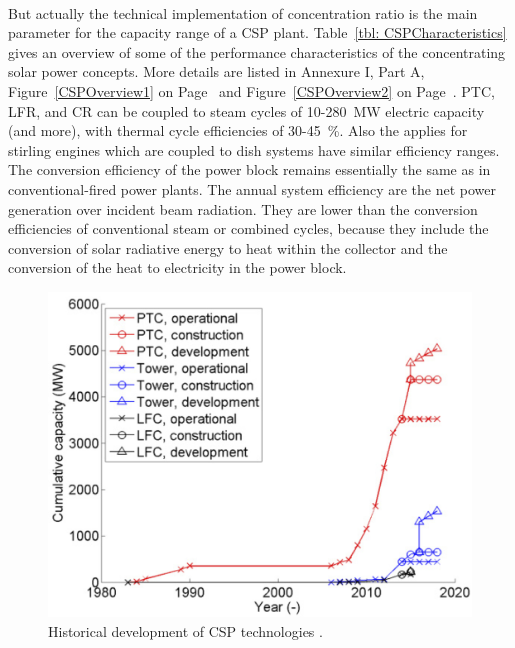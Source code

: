 \documentclass[Master,MEE,english]{twbook}%
\begin{document}
\\
But actually the technical implementation of concentration ratio is the main parameter for the capacity range of a CSP plant. Table~\ref{tbl: CSPCharacteristics} gives an overview of some of the performance characteristics of the concentrating solar power concepts. More details are listed in Annexure I, Part A, Figure~\ref{CSPOverview1} on Page~\pageref{CSPOverview1} and Figure~\ref{CSPOverview2} on Page~\pageref{CSPOverview2}. PTC, LFR, and CR can be coupled to steam cycles of 10-280~MW electric capacity (and more), with thermal cycle efficiencies of 30-45~\%. Also the applies for stirling engines which are coupled to dish systems have similar efficiency ranges. The conversion efficiency of the power block remains essentially the same as in conventional-fired power plants. The annual system efficiency are the net power generation over incident beam radiation. They are lower than the conversion efficiencies of conventional steam or combined cycles, because they include the conversion of solar radiative energy to heat within the collector and the conversion of the heat to electricity in the power block. \cite{Pitz-Paal.2013}\\
\begin{figure}[!h] 
\centering
\includegraphics[width=0.65\linewidth]{FIG/CSP_technology_development}
\caption[Historical development of CSP technologies.]{Historical development of CSP technologies \cite{Abbas2015}.}\label{CSP_technology_development}
\end{figure}\\
\end{document}
